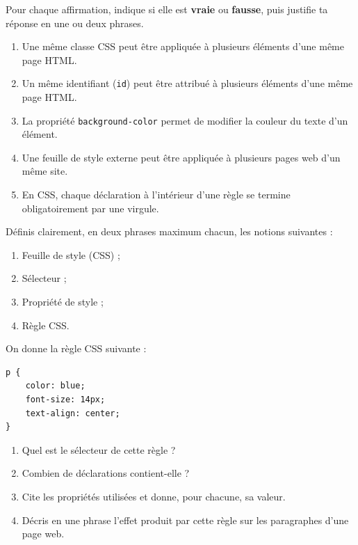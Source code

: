 \documentclass[11pt]{article}
\newcommand{\cle}[1]{{\popxbold\color{popdark}#1}}
\begin{document}
\begin{exercice}
Pour chaque affirmation, indique si elle est \textbf{vraie} ou \textbf{fausse}, puis justifie ta réponse en une ou deux phrases.
\begin{enumerate}
  \item Une même classe \cle{CSS} peut être appliquée à plusieurs éléments d'une même page \cle{HTML}.
  \item Un même identifiant (\texttt{id}) peut être attribué à plusieurs éléments d'une même page \cle{HTML}.
  \item La propriété \texttt{background-color} permet de modifier la couleur du texte d'un élément.
  \item Une feuille de style externe peut être appliquée à plusieurs pages web d'un même site.
  \item En \cle{CSS}, chaque déclaration à l'intérieur d'une règle se termine obligatoirement par une virgule.
\end{enumerate}
\end{exercice}

\begin{exercice}[Définitions]
Définis clairement, en deux phrases maximum chacun, les notions suivantes :
\begin{enumerate}
  \item Feuille de style (\cle{CSS}) ;
  \item Sélecteur ;
  \item Propriété de style ;
  \item Règle \cle{CSS}.
\end{enumerate}
\end{exercice}

\begin{exercice}
On donne la règle \cle{CSS} suivante :
\begin{lstlisting}
p {
    color: blue;
    font-size: 14px;
    text-align: center;
}
\end{lstlisting}
\begin{enumerate}
  \item Quel est le sélecteur de cette règle ?
  \item Combien de déclarations contient-elle ?
  \item Cite les propriétés utilisées et donne, pour chacune, sa valeur.
  \item Décris en une phrase l'effet produit par cette règle sur les paragraphes d'une page web.
\end{enumerate}
\end{exercice}
\end{document}
